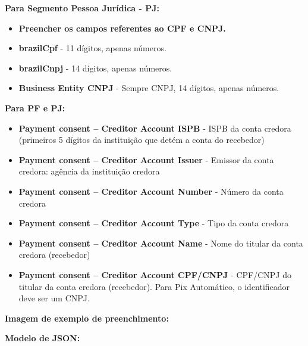 \textbf{Para Segmento Pessoa Jurídica - PJ:}
\begin{itemize}
    \item \textbf{\textcolor{red!80}{Preencher os campos referentes ao CPF e CNPJ.}}
    \item \textbf{\textcolor{red!80}{brazilCpf}} - 11 dígitos, apenas números.
    \item \textbf{\textcolor{red!80}{brazilCnpj}} - 14 dígitos, apenas números.
    \item \textbf{\textcolor{red!80}{Business Entity CNPJ}} - Sempre CNPJ, 14 dígitos, apenas números.
\end{itemize}

\textbf{Para PF e PJ:}

\begin{itemize}
    \item \textbf{\textcolor{red!80}{Payment consent – Creditor Account ISPB}} - ISPB da conta credora (primeiros 5 dígitos da instituição que detém a conta do recebedor)
    \item \textbf{\textcolor{red!80}{Payment consent – Creditor Account Issuer}} - Emissor da conta credora: agência da instituição credora
    \item \textbf{\textcolor{red!80}{Payment consent – Creditor Account Number}} - Número da conta credora
    \item \textbf{\textcolor{red!80}{Payment consent – Creditor Account Type}} - Tipo da conta credora
    \item \textbf{\textcolor{red!80}{Payment consent – Creditor Account Name}} - Nome do titular da conta credora (recebedor)
    \item \textbf{\textcolor{red!80}{Payment consent – Creditor Account CPF/CNPJ}} - CPF/CNPJ do titular da conta credora (recebedor). Para Pix Automático, o identificador deve ser um CNPJ.
\end{itemize}

\textbf{Imagem de exemplo de preenchimento:}

\begin{figure}[H]
    \centering
    \label{fig:automaticolonga}
\end{figure}

\textbf{Modelo de JSON:}

